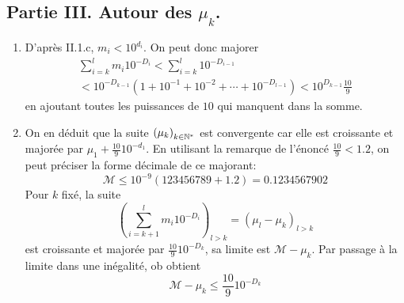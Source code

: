 \subsection*{Partie III. Autour des $\mu_k$.}
\begin{enumerate}
 \item D'après II.1.c, $m_i<10^{d_i}$. On peut donc majorer
\begin{multline*}
 \sum_{i=k}^{l}m_i10^{-D_i}<\sum_{i=k}^{l}10^{-D_{i-1}}\\
<10^{-D_{k-1}}\left( 1 + 10^{-1} + 10^{-2} + \cdots + 10^{-D_{l-1}}\right)<10^{D_{k-1}}\frac{10}{9} 
\end{multline*}
en ajoutant toutes les puissances de $10$ qui manquent dans la somme.
 \item On en déduit que la suite $\left( \mu_k\right) _{k\in \mathbb{N}^*}$ est convergente car elle est croissante et majorée par $\mu_1 + \frac{10}{9}10^{-d_1}$. En utilisant la remarque de l'énoncé $\frac{10}{9}<1.2$, on peut préciser la forme décimale de ce majorant:
\begin{displaymath}
 \mathcal{M}\leq 10^{-9}\left(123456789 + 1.2 \right)= 0.1234567902 
\end{displaymath}
Pour $k$ fixé, la suite 
\begin{displaymath}
 \left( \sum_{i=k+1}^{l}m_i10^{-D_i}\right)_{l>k} = \left( \mu_l -\mu_k\right)_{l>k}
\end{displaymath}
est croissante et majorée par $\frac{10}{9}10^{-D_k}$, sa limite est $\mathcal{M}-\mu_k$. Par passage à la limite dans une inégalité, ob obtient
\begin{displaymath}
 \mathcal{M}-\mu_k \leq \frac{10}{9}10^{-D_k}
\end{displaymath}


\end{enumerate}
